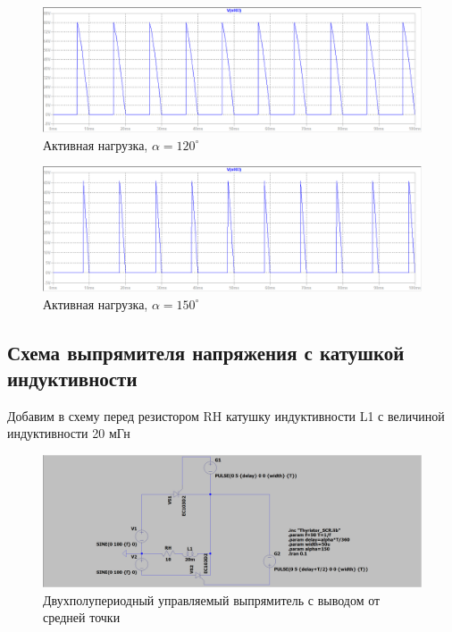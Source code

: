 \documentclass[a4paper, 12pt]{article}
\begin{document}
    \begin{figure}[H]
        \centering
        \includegraphics[scale=0.45]{a120.png}
        \captionsetup{skip=0pt}
        \caption{Активная нагрузка, $\alpha=120^{\circ}$}
        \label{fig:a120}
    \end{figure}
    \begin{figure}[H]
        \centering
        \includegraphics[scale=0.45]{a150.png}
        \captionsetup{skip=0pt}
        \caption{Активная нагрузка, $\alpha=150^{\circ}$}
        \label{fig:a150}
    \end{figure}


    \subsection{Схема выпрямителя напряжения с катушкой индуктивности}
    Добавим в схему перед резистором RH катушку индуктивности L1 с величиной индуктивности 20 мГн
    \begin{figure}[H]
        \centering
        \includegraphics[scale=0.22]{scheme2.png}
        \captionsetup{skip=0pt}
        \caption{Двухполупериодный управляемый выпрямитель с выводом от средней точки}
        \label{fig:scheme2}
    \end{figure}
\end{document}

